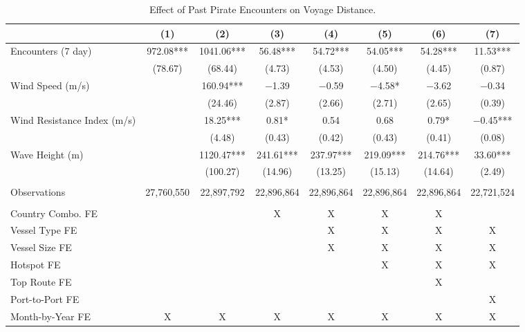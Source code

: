 \begin{table}
\centering
\caption{Effect of Past Pirate Encounters on Voyage Distance. \label{tab:spec-dist-table-rev}}
\centering
\begin{adjustbox}{width = .9\textwidth}
\begin{threeparttable}
\begin{tabular}[t]{lccccccc}
\toprule
  & (1) & (2) & (3) & (4) & (5) & (6) & (7)\\
\midrule
Encounters (7 day) & \num{972.08}*** & \num{1041.06}*** & \num{56.48}*** & \num{54.72}*** & \num{54.05}*** & \num{54.28}*** & \num{11.53}***\\
 & (\num{78.67}) & (\num{68.44}) & (\num{4.73}) & (\num{4.53}) & (\num{4.50}) & (\num{4.45}) & (\num{0.87})\\
Wind Speed (m/s) &  & \num{160.94}*** & \num{-1.39} & \num{-0.59} & \num{-4.58}* & \num{-3.62} & \num{-0.34}\\
 &  & (\num{24.46}) & (\num{2.87}) & (\num{2.66}) & (\num{2.71}) & (\num{2.65}) & (\num{0.39})\\
Wind Resistance Index (m/s) &  & \num{18.25}*** & \num{0.81}* & \num{0.54} & \num{0.68} & \num{0.79}* & \num{-0.45}***\\
 &  & (\num{4.48}) & (\num{0.43}) & (\num{0.42}) & (\num{0.43}) & (\num{0.41}) & (\num{0.08})\\
Wave Height (m) &  & \num{1120.47}*** & \num{241.61}*** & \num{237.97}*** & \num{219.09}*** & \num{214.76}*** & \num{33.60}***\\
 &  & (\num{100.27}) & (\num{14.96}) & (\num{13.25}) & (\num{15.13}) & (\num{14.64}) & (\num{2.49})\\
 &  &  &  &  &  &  & \\
Observations & 27,760,550 & 22,897,792 & 22,896,864 & 22,896,864 & 22,896,864 & 22,896,864 & 22,721,524\\
 &  &  &  &  &  &  & \\
Country Combo. FE &  &  & X & X & X & X & \\
Vessel Type FE &  &  &  & X & X & X & X\\
Vessel Size FE &  &  &  & X & X & X & X\\
Hotspot FE &  &  &  &  & X & X & X\\
Top Route FE &  &  &  &  &  & X & \\
Port-to-Port FE &  &  &  &  &  &  & X\\
Month-by-Year FE & X & X & X & X & X & X & X\\
\bottomrule
\end{tabular}

\end{threeparttable}
\end{adjustbox}
\end{table}
